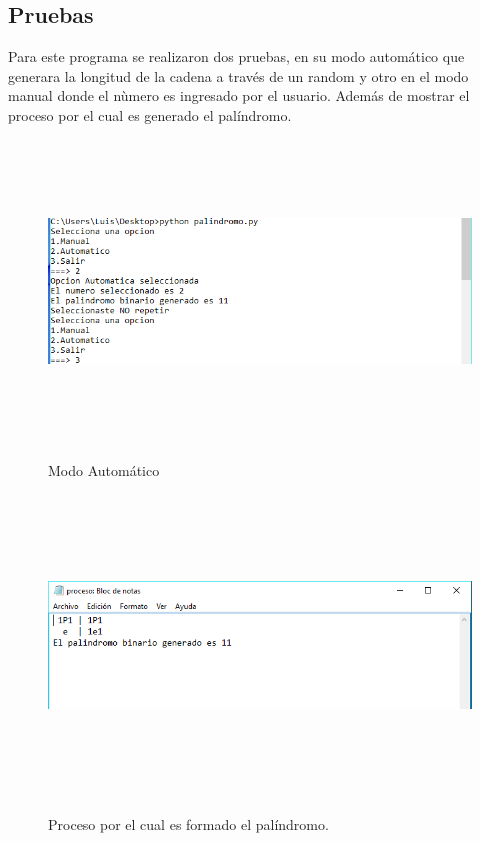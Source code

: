 \documentclass[12pt]{article}
\begin{document}
\subsection{Pruebas}

Para este programa se realizaron dos pruebas, en su modo automático que generara la longitud de la cadena a través de un random y otro en el modo manual donde el nùmero es ingresado por el usuario. Además de mostrar el proceso por el cual es generado el palíndromo.

\begin{figure}[H]
\begin{center}
\includegraphics[width=\textwidth, height=8cm]{auto_palindromo}
\label{ }
\caption{Modo Automático}
\end{center}
\end{figure}

\begin{figure}[H]
\begin{center}
\includegraphics[width=\textwidth, height=8cm]{auto_palindromo_proceso}
\label{ }
\caption{Proceso por el cual es formado el palíndromo.}
\end{center}
\end{figure}
\end{document}
